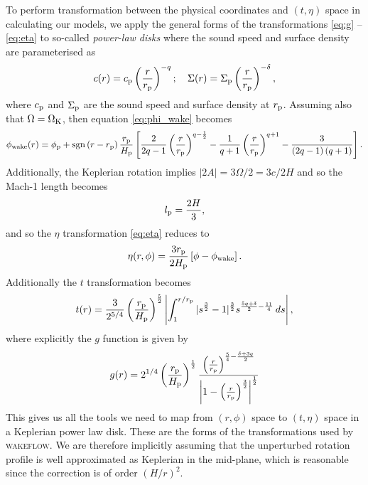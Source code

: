 To perform transformation between the physical coordinates and $(t,\eta)$ space in calculating our models, we apply the general forms of the transformations \ref{eq:g} -- \ref{eq:eta} to so-called \textit{power-law disks} where the sound speed and surface density are parameterised as
\begin{align}
    c(r) = c_{\rm p} \left(\frac{r}{r_{\rm p}}\right)^{-q}; \quad \Sigma(r) = \Sigma_{\rm p} \left(\frac{r}{r_{\rm p}}\right)^{-\delta},
\end{align}
where $c_{\rm p}$ and $\Sigma_{\rm p}$ are the sound speed and surface density at $r_{\rm p}$.
Assuming also that $\Omega=\Omega_{\rm K}$, then equation \ref{eq:phi_wake} becomes \citep{rafikov2002a}
\begin{align}
    \phi_{\rm wake}(r) = \phi_{\rm p} + {\rm sgn} \left( r - r_{\rm p} \right) \frac{r_{\rm p}}{H_{\rm p}} \left[ \frac{2}{2q-1} \left(\frac{r}{r_{\rm p}}\right)^{q-\frac{1}{2}} - \frac{1}{q+1} \left(\frac{r}{r_{\rm p}}\right)^{q+1} - \frac{3}{\left(2q-1\right)\left(q+1\right)} \right].
\end{align}
Additionally, the Keplerian rotation implies $|2A| = 3\Omega/2 = 3c/2H$ and so the Mach-1 length becomes
\begin{align}
    l_{\rm p} = \frac{2H}{3},
\end{align}
and so the $\eta$ transformation \ref{eq:eta} reduces to 
\begin{align}
    \eta(r, \phi) = \frac{3 r_{\rm p}}{2 H_{\rm p}} \left[ \phi - \phi_{\rm wake} \right].
\end{align}
Additionally the $t$ transformation becomes \citep{rafikov2002a}
\begin{align}
    t(r) = \frac{3}{2^{5/4}} \left( \frac{r_{\rm p}}{H_{\rm p}} \right)^{\frac{5}{2}} \left| \int_1^{r/r_{\rm p}} |s^\frac{3}{2} - 1|^\frac{3}{2} s^{\frac{5q+\delta}{2}-\frac{11}{4}}\, ds \right|, \label{eq:t_power}
\end{align}
where explicitly the $g$ function is given by \citep{bollati2021}
\begin{align}
    g(r) = 2^{1/4} \left( \frac{r_{\rm p}}{H_{\rm p}} \right)^{\frac{1}{2}} \frac{\left( \frac{r}{r_{\rm p}} \right)^{\frac{5}{4} - \frac{\delta + 3q}{2}}}{\left| 1 - \left(\frac{r}{r_{\rm p}}\right)^\frac{3}{2} \right|^\frac{1}{2}} \label{eq:g_power}
\end{align}
This gives us all the tools we need to map from $(r,\phi)$ space to $(t,\eta)$ space in a Keplerian power law disk.
These are the forms of the transformations used by \textsc{wakeflow}.
We are therefore implicitly assuming that the unperturbed rotation profile is well approximated as Keplerian in the mid-plane, which is reasonable since the correction is of order $\left(H/r\right)^2$.

